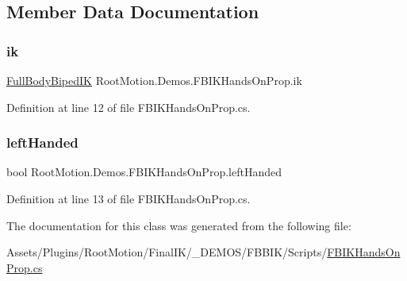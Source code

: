 \subsection{Member Data Documentation}
\mbox{\label{class_root_motion_1_1_demos_1_1_f_b_i_k_hands_on_prop_a33ee4c43d3c774795a3f67d5c19a46d4}} 
\subsubsection{\texorpdfstring{ik}{ik}}
{\footnotesize\ttfamily \mbox{\hyperlink{class_root_motion_1_1_final_i_k_1_1_full_body_biped_i_k}{Full\+Body\+Biped\+IK}} Root\+Motion.\+Demos.\+F\+B\+I\+K\+Hands\+On\+Prop.\+ik}



Definition at line 12 of file F\+B\+I\+K\+Hands\+On\+Prop.\+cs.

\mbox{\label{class_root_motion_1_1_demos_1_1_f_b_i_k_hands_on_prop_a89595590761816601d7bdadec5148d9b}} 
\subsubsection{\texorpdfstring{left\+Handed}{leftHanded}}
{\footnotesize\ttfamily bool Root\+Motion.\+Demos.\+F\+B\+I\+K\+Hands\+On\+Prop.\+left\+Handed}



Definition at line 13 of file F\+B\+I\+K\+Hands\+On\+Prop.\+cs.



The documentation for this class was generated from the following file\+:\begin{DoxyCompactItemize}
\item 
Assets/\+Plugins/\+Root\+Motion/\+Final\+I\+K/\+\_\+\+D\+E\+M\+O\+S/\+F\+B\+B\+I\+K/\+Scripts/\mbox{\hyperlink{_f_b_i_k_hands_on_prop_8cs}{F\+B\+I\+K\+Hands\+On\+Prop.\+cs}}\end{DoxyCompactItemize}
